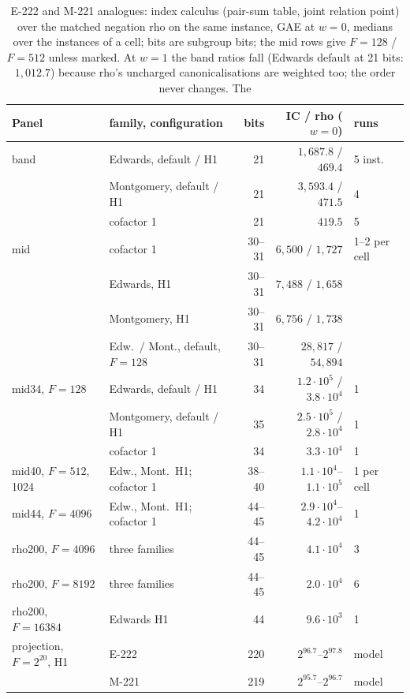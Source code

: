 \begin{table}[t]
\centering\footnotesize
\begin{tabular}{@{}llrrl@{}}
\toprule
Panel & family, configuration & bits & IC / rho ($w=0$) & runs \\
\midrule
band & Edwards, default / H1 & 21 & $1{,}687.8$ / $469.4$ & 5 inst. \\
 & Montgomery, default / H1 & 21 & $3{,}593.4$ / $471.5$ & 4 \\
 & cofactor 1 & 21 & $419.5$ & 5 \\
mid & cofactor 1 & 30--31 & $6{,}500$ / $1{,}727$ & 1--2 per cell \\
 & Edwards, H1 & 30--31 & $7{,}488$ / $1{,}658$ & \\
 & Montgomery, H1 & 30--31 & $6{,}756$ / $1{,}738$ & \\
 & Edw.\ / Mont., default, $F=128$ & 30--31 & $28{,}817$ / $54{,}894$ & \\
mid34, $F=128$ & Edwards, default / H1 & 34 & $1.2\cdot10^5$ / $3.8\cdot10^4$ & 1 \\
 & Montgomery, default / H1 & 35 & $2.5\cdot10^5$ / $2.8\cdot10^4$ & 1 \\
 & cofactor 1 & 34 & $3.3\cdot10^4$ & 1 \\
mid40, $F=512$, 1024 & Edw., Mont.\ H1; cofactor 1 & 38--40 & $1.1\cdot10^4$--$1.1\cdot10^5$ & 1 per cell \\
mid44, $F=4096$ & Edw., Mont.\ H1; cofactor 1 & 44--45 & $2.9\cdot10^4$--$4.2\cdot10^4$ & 1 \\
rho200, $F=4096$ & three families & 44--45 & $4.1\cdot10^4$ & 3 \\
rho200, $F=8192$ & three families & 44--45 & $2.0\cdot10^4$ & 6 \\
rho200, $F=16384$ & Edwards H1 & 44 & $9.6\cdot10^3$ & 1 \\
\addlinespace
projection, $F=2^{20}$, H1 & E-222 & 220 & $2^{96.7}$--$2^{97.8}$ & model \\
 & M-221 & 219 & $2^{95.7}$--$2^{96.7}$ & model \\
\bottomrule
\end{tabular}
\caption[]{E-222 and M-221 analogues: index calculus (pair-sum table,
joint relation point) over the matched negation rho on the same instance,
GAE at $w=0$, medians over the instances of a cell; bits are subgroup
bits; the mid rows give $F=128$ / $F=512$ unless marked. At $w=1$ the band ratios
fall (Edwards default at 21 bits: $1{,}012.7$) because rho's uncharged
canonicalisations are weighted too; the order never changes. The
}
\end{table}
